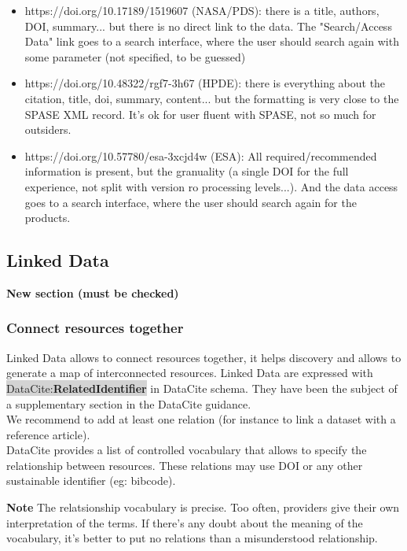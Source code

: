 \documentclass[11pt,a4paper]{ivoa}
\newcommand{\dataciteterm}[1]{\colorbox{lightgray}{DataCite:\textbf{#1}}}
\newcommand{\important}[1]{
	\begin{bigdescription}
		\item \color{ivoacolor}\textbf{Note} #1
	\end{bigdescription}
}
\begin{document}
\begin{itemize}
    \item https://doi.org/10.17189/1519607 (NASA/PDS): there is a title, authors, DOI, summary... but there is no direct link to the data. The "Search/Access Data" link goes to a search interface, where the user should search again with some parameter (not specified, to be guessed)
    \item https://doi.org/10.48322/rgf7-3h67 (HPDE): there is everything about the citation, title, doi, summary, content... but the formatting is very close to the SPASE XML record. It's ok for user fluent with SPASE, not so much for outsiders.
    \item https://doi.org/10.57780/esa-3xcjd4w (ESA): All required/recommended information is present, but the granuality (a single DOI for the full experience, not split with version ro processing levels...). And the data access goes to a search interface, where the user should search again for the products.
\end{itemize}


\subsection{Linked Data}
\label{sec:linkeddata}
\textbf{\color{red}New section (must be checked)}

\subsubsection{Connect resources together}
Linked Data allows to connect resources together, it helps discovery and allows to generate a map of interconnected resources. 
Linked Data are expressed with \dataciteterm{RelatedIdentifier} in DataCite schema. They have been the subject of a supplementary section in the DataCite guidance.\\

We recommend to add at least one relation (for instance to link a dataset with a reference article).\\


DataCite provides a list of controlled vocabulary that allows to specify the relationship between resources.
These relations may use DOI or any other sustainable identifier (eg: bibcode).

\important{	
The relatsionship vocabulary is precise.
Too often, providers give their own interpretation of the terms.
If there's any doubt about the meaning of the vocabulary,
it's better to put no relations than a misunderstood relationship.
}
\end{document}
